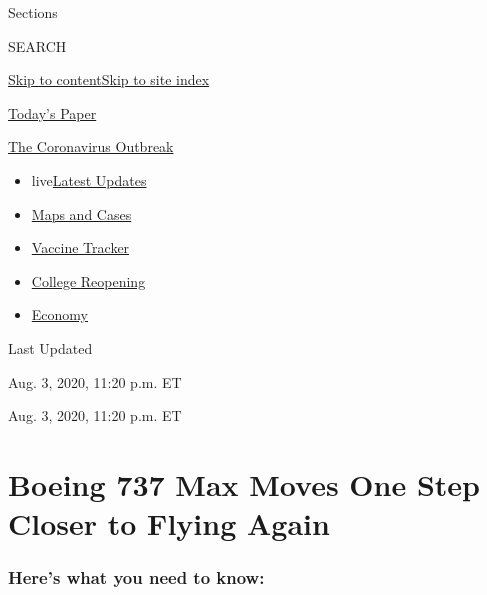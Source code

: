 Sections

SEARCH

\protect\hyperlink{site-content}{Skip to
content}\protect\hyperlink{site-index}{Skip to site index}

\href{https://myaccount.nytimes.com/auth/login?response_type=cookie\&client_id=vi}{}

\href{https://www.nytimes.com/section/todayspaper}{Today's Paper}

\href{https://www.nytimes.com/news-event/coronavirus}{The Coronavirus
Outbreak}

\begin{itemize}
\tightlist
\item
  live\href{https://www.nytimes.com/2020/08/03/world/coronavirus-covid-19.html}{Latest
  Updates}
\item
  \href{https://www.nytimes.com/interactive/2020/us/coronavirus-us-cases.html}{Maps
  and Cases}
\item
  \href{https://www.nytimes.com/interactive/2020/science/coronavirus-vaccine-tracker.html}{Vaccine
  Tracker}
\item
  \href{https://www.nytimes.com/2020/08/02/us/covid-college-reopening.html}{College
  Reopening}
\item
  \href{https://www.nytimes.com/live/2020/08/03/business/stock-market-today-coronavirus}{Economy}
\end{itemize}

Last Updated

Aug. 3, 2020, 11:20 p.m. ET

Aug. 3, 2020, 11:20 p.m. ET

\hypertarget{boeing-737-max-moves-one-step-closer-to-flying-again}{%
\section{Boeing 737 Max Moves One Step Closer to Flying
Again}\label{boeing-737-max-moves-one-step-closer-to-flying-again}}

\hypertarget{heres-what-you-need-to-know}{%
\subsubsection{Here's what you need to
know:}\label{heres-what-you-need-to-know}}

